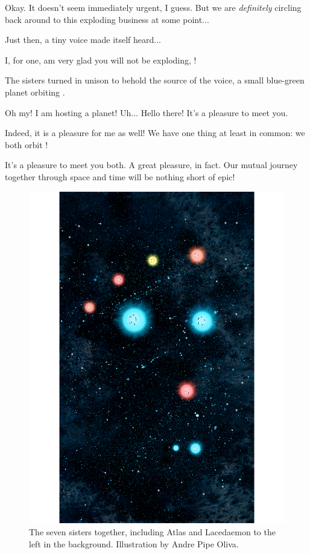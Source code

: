 \documentclass[main.tex]{subfiles}
\begin{document}
\par \Merope Okay.  It doesn't seem immediately urgent, I guess. But we are \textit{definitely} circling back around to this exploding business at some point...

\par \nar Just then, a tiny voice made itself heard...

\par \Deltab I, for one, am very glad you will not be exploding, \rmmerope!

\par \nar The sisters turned in unison to behold the source of the voice, a small blue-green planet orbiting \rmmerope.

\par \Merope Oh my!  I am hosting a planet!  Uh... Hello there!  It's a pleasure to meet you.

\par \Maia Indeed, it is a pleasure for me as well!  We have one thing at least in common:  we both orbit \rmmerope!

\par \Deltab It's a pleasure to meet you both.  A great pleasure, in fact. Our mutual journey together through space and time will be nothing short of epic!

\begin{figure}
\includegraphics[width=\columnwidth,angle=270,origin=c]{ch1_3.pdf}
\caption{The seven sisters together, including Atlas and Lacedaemon to the left in the background.  Illustration by Andre Pipe Oliva.
\label{fig:fig3}}
\end{figure}
\end{document}
